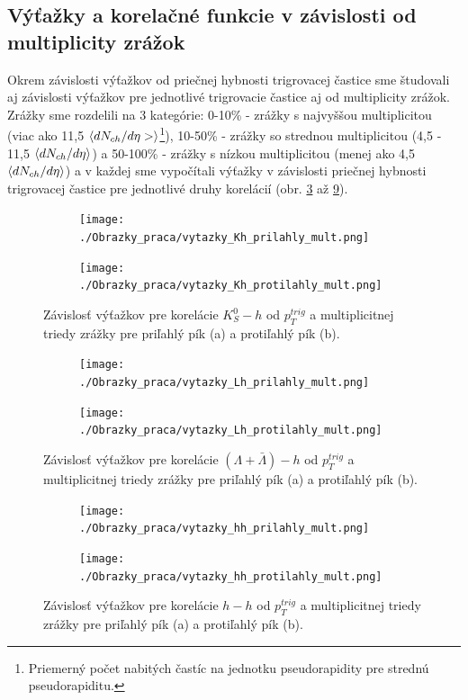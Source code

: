 \documentclass[thesismargins, thesislinespacing]{rnthesis}
\begin{document}
\subsection{Výťažky a korelačné funkcie v závislosti od multiplicity zrážok}
Okrem závislosti výťažkov od priečnej hybnosti trigrovacej častice sme študovali aj závislosti výťažkov pre jednotlivé trigrovacie častice aj od multiplicity zrážok. Zrážky sme rozdelili na 3 kategórie: 0-10\% - zrážky s najvyššou multiplicitou (viac ako 11,5 $\braket{dN_{ch}/d\eta>}$\footnote{Priemerný počet nabitých častíc na jednotku pseudorapidity pre strednú pseudorapiditu.}), 10-50\% - zrážky so strednou multiplicitou (4,5 - 11,5 $\braket{dN_{ch}/d\eta}$) a 50-100\% - zrážky s nízkou multiplicitou (menej ako 4,5 $\braket{dN_{ch}/d\eta}$) a v každej sme vypočítali výťažky v závislosti priečnej hybnosti trigrovacej častice pre jednotlivé druhy korelácií (obr. \ref{K0mult} až \ref{hhmult}).
\begin{figure}
	\centering
	\begin{subfigure}{0.5\textwidth}
		\centering
		\texttt{[image: ./Obrazky\_praca/vytazky\_Kh\_prilahly\_mult.png]}
		\caption{}
		\label{K0pril}
	\end{subfigure}%
	\begin{subfigure}{0.5\textwidth}
		\centering
		\texttt{[image: ./Obrazky\_praca/vytazky\_Kh\_protilahly\_mult.png]}
		\caption{}
		\label{K0proti}
	\end{subfigure}
	\caption{Závislosť výťažkov pre korelácie $K^0_S - h$ od $p_T^{trig}$ a multiplicitnej triedy zrážky pre priľahlý pík (a) a protiľahlý pík (b).}
	\label{K0mult}
\end{figure}
\begin{figure}
	\centering
	\begin{subfigure}{0.5\textwidth}
		\centering
		\texttt{[image: ./Obrazky\_praca/vytazky\_Lh\_prilahly\_mult.png]}
		\caption{}
		\label{Lampril}
	\end{subfigure}%
	\begin{subfigure}{0.5\textwidth}
		\centering
		\texttt{[image: ./Obrazky\_praca/vytazky\_Lh\_protilahly\_mult.png]}
		\caption{}
		\label{Lamproti}
	\end{subfigure}
	\caption{Závislosť výťažkov pre korelácie $(\Lambda + \bar{\Lambda})- h$ od $p_T^{trig}$ a multiplicitnej triedy zrážky pre priľahlý pík (a) a protiľahlý pík (b).}
	\label{Lammult}
\end{figure}
\begin{figure}
	\centering
	\begin{subfigure}{0.5\textwidth}
		\centering
		\texttt{[image: ./Obrazky\_praca/vytazky\_hh\_prilahly\_mult.png]}
		\caption{}
		\label{hhpril}
	\end{subfigure}%
	\begin{subfigure}{0.5\textwidth}
		\centering
		\texttt{[image: ./Obrazky\_praca/vytazky\_hh\_protilahly\_mult.png]}
		\caption{}
		\label{hhproti}
	\end{subfigure}
	\caption{Závislosť výťažkov pre korelácie $h - h$ od $p_T^{trig}$ a multiplicitnej triedy zrážky pre priľahlý pík (a) a protiľahlý pík (b).}
	\label{hhmult}
\end{figure}
\end{document}
